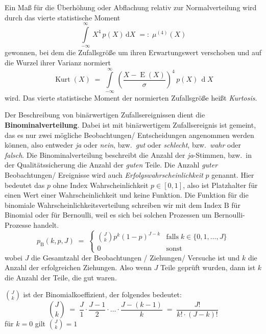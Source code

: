 Ein Maß für die Überhöhung oder Abflachung relativ zur Normalverteilung wird durch
das vierte statistische Moment
\begin{equation}
\int\limits_{-\infty}^{\infty} \, X^4 \, p(X) \, \mathrm{d} X \; =: \; \mu^{(4)}(X)
\end{equation}
gewonnen, bei dem die Zufallsgröße um ihren Erwartungswert verschoben und auf die Wurzel ihrer
Varianz normiert
\begin{equation}
\operatorname{Kurt}(X) \; = \;  \int\limits_{-\infty}^{\infty} \, \left(\frac{X - \operatorname{E}(X)}{\sigma}
\right)^4 \, p(X) \, \operatorname{d} X
\end{equation}
wird. Das vierte statistische Moment der normierten Zufallsgröße heißt
\textsl{Kurtosis}.


Der Beschreibung von binärwertigen Zufallsereignissen dient die \textbf{Binominalverteilung}.
Dabei ist mit binärwertigem Zufallsereignis ist gemeint, das es nur zwei mögliche
Beobachtungen/ Entscheidungen angenommen werden können, also entweder \textsl{ja} oder \textsl{nein},
bzw.\ \textsl{gut} oder \textsl{schlecht},
bzw.\ \textsl{wahr} oder \textsl{falsch}. Die Binominalverteilung beschreibt die Anzahl der
\textsl{ja}-Stimmen, bzw.\ in der Qualitätssicherung die Anzahl der \textsl{guten} Teile.
Die Anzahl \textsl{guter} Beobachtungen/ Ereignisse wird auch \textsl{Erfolgswahrscheinlichkeit}
$p$ genannt. Hier bedeutet das $p$ ohne Index Wahrscheinlichkeit $p \in [0,1]$,
also ist Platzhalter für einen Wert einer Wahrscheinlichkeit und keine Funktion.
Die Funktion für die binomiale Wahrscheinlichkeitsverteilung schreiben wir mit dem Index $\mathrm{B}$ für
Binomial oder für Bernoulli, weil es sich bei solchen Prozessen um Bernoulli-Prozesse handelt.
\begin{equation}
p_\mathrm{B}(k, p, J) \; = \;
\left\{ \begin{array}{ll}
\binom{J}{k} p^k \left(1 - p\right)^{J - k} & \text{falls} \; k \in \{0, 1, \dots, J\}\\
0 & \text{sonst}
\end{array}\right.
\end{equation}
wobei $J$ die Gesamtzahl der Beobachtungen / Ziehungen/ Versuche ist und $k$ die Anzahl der
erfolgreichen Ziehungen. Also wenn $J$ Teile geprüft wurden, dann ist $k$ die Anzahl der Teile,
die gut waren.

$\binom{J}{k}$ ist der Binomialkoeffizient, der folgendes bedeutet:
$$
\binom{J}{k} \; = \; \frac{J}{1} \cdot \frac{J-1}{2} \cdot
  \dots \cdot \frac{J- (k-1)}{k} \; = \;
  \frac{J!}{k! \cdot (J - k)!}
$$
für $k = 0$ gilt $\binom{J}{k} = 1$

